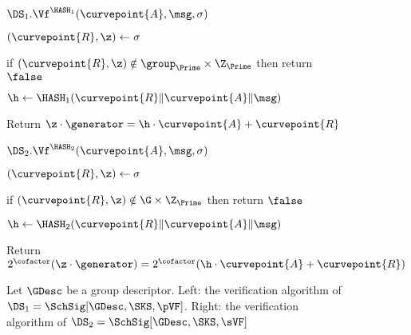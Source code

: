 \begin{figure}
	{
		\begin{algorithm-initial}{$\DS_1.\Vf^{\HASH_1}(\curvepoint{A}, \msg, \sigma)$}
			\item $(\curvepoint{R}, \z) \gets \sigma$
			\item if $(\curvepoint{R}, \z) \notin \group_{\Prime} \times \Z_{\Prime}$ then return $\false$
			\item  $\h \gets \HASH_1(\curvepoint{R}\|\curvepoint{A}\| \msg)$
			\item Return $\z \cdot \generator = \h \cdot \curvepoint{A} + \curvepoint{R}$
		\end{algorithm-initial}  \vspace{2pt}
	}
	{
		\begin{algorithm-initial}{$\DS_2.\Vf^{\HASH_2}(\curvepoint{A}, \msg, \sigma)$}
			\item $(\curvepoint{R}, \z) \gets \sigma$
			\item if $(\curvepoint{R}, \z) \notin \G \times \Z_{\Prime}$ then return $\false$
			\item $\h \gets \HASH_2(\curvepoint{R}\|\curvepoint{A}\| \msg)$
			\item Return $2^\cofactor(\z \cdot  \generator)= 2^\cofactor(\h \cdot \curvepoint{A} + \curvepoint{R})$
		\end{algorithm-initial} 
	}
	\vspace{-8pt}
	\caption{Let $\GDesc$ be a group descriptor. Left: the verification algorithm of $\DS_1 = \SchSig[\GDesc,\SKS,\pVF]$. Right: the verification algorithm of $\DS_2 = \SchSig[\GDesc,\SKS,\sVF]$}
	\label{fig:sVF and pVF}
	\hrulefill
	\vspace{-10pt}
\end{figure}


